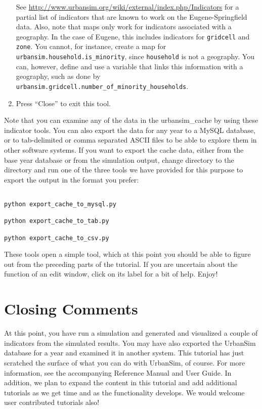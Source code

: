 \documentclass{howto}
\begin{document}
\begin{enumerate}
See \url{http://www.urbansim.org/wiki/external/index.php/Indicators} for a
partial list of indicators that are known to work on the Eugene-Springfield
data.  Also, note that maps only
work for indicators associated with a geography.  In the case of Eugene, this
includes indicators for \verb|gridcell| and \verb|zone|.
You cannot, for instance, 
create a map for \verb|urbansim.household.is_minority|, since \verb|household|
is not a geography.  You can, however, define and use a variable that links this
information with a geography, such as done by 
\verb|urbansim.gridcell.number_of_minority_households|.  

\item Press ``Close'' to exit this tool.

\end{enumerate}

Note that you can examine any of the data in the urbansim_cache by
using these indicator tools.  You can also export the data for any
year to a MySQL database, or to tab-delimited or comma separated
ASCII files to be able to explore them in other software systems. If
you want to export the cache data, either from the base year
database or from the simulation output, change directory to the
 directory and run one of the three
tools we have provided for this purpose to export the output in the
format you prefer:

\begin{verbatim}

python export_cache_to_mysql.py

python export_cache_to_tab.py

python export_cache_to_csv.py

\end{verbatim}

These tools open a simple tool, which at this point you should be
able to figure out from the preceding parts of the tutorial.  If you
are uncertain about the function of an edit window, click on its
label for a bit of help. Enjoy!

\section*{Closing Comments}

At this point, you have run a simulation and generated and
visualized a couple of indicators from the simulated results. You
may have also exported the UrbanSim database for a year and examined
it in another system. This tutorial has just scratched the
surface of what you can do with UrbanSim, of course. For more information,
see the accompanying Reference Manual and User Guide. In addition,
we plan to expand the content in this tutorial and add additional
tutorials as we get time and as the functionality develops.  We
would welcome user contributed tutorials also!
\end{document}
